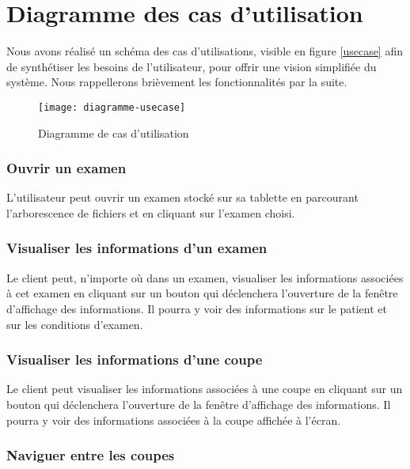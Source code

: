 \section{Diagramme des cas d'utilisation}\label{casutilisation} 

Nous avons réalisé un schéma des cas d'utilisations, visible en figure \vref{usecase} afin de synthétiser les besoins de l'utilisateur, pour offrir une vision simplifiée du système. Nous rappellerons brièvement les fonctionnalités par la suite.

\begin{figure}[h]
\begin{center}
    \texttt{[image: diagramme-usecase]}
\end{center}
    \caption{Diagramme de cas d'utilisation}
    \label{usecase}                      
\end{figure}

\subsubsection{Ouvrir un examen}

L'utilisateur peut ouvrir un examen stocké sur sa tablette en parcourant l'arborescence de fichiers
et en cliquant sur l'examen choisi.

\subsubsection{Visualiser les informations d'un examen}

Le client peut, n'importe où dans un examen, visualiser les informations associées à cet examen
en cliquant sur un bouton qui déclenchera l'ouverture de la fenêtre d'affichage des informations.
Il pourra y voir des informations sur le patient et sur les conditions d'examen.

\subsubsection{Visualiser les informations d'une coupe}

Le client peut visualiser les informations associées à une coupe
en cliquant sur un bouton qui déclenchera l'ouverture de la fenêtre d'affichage des informations.
Il pourra y voir des informations associées à la coupe affichée à l'écran.

\subsubsection{Naviguer entre les coupes}

